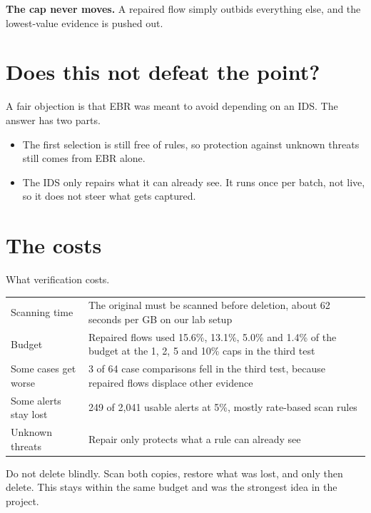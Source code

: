 \textbf{The cap never moves.} A repaired flow simply outbids everything else, and the lowest-value evidence is pushed out.

\section{Does this not defeat the point?}
A fair objection is that EBR was meant to avoid depending on an IDS. The answer has two parts.
\begin{itemize}
\item The first selection is still free of rules, so protection against unknown threats still comes from EBR alone.
\item The IDS only repairs what it can already see. It runs once per batch, not live, so it does not steer what gets captured.
\end{itemize}

\section{The costs}
\begin{gtable}{What verification costs.}
\begin{tabularx}{\linewidth}{l L}
\toprule
{} & \\
\midrule
Scanning time & The original must be scanned before deletion, about 62 seconds per GB on our lab setup\\
Budget & Repaired flows used 15.6\%, 13.1\%, 5.0\% and 1.4\% of the budget at the 1, 2, 5 and 10\% caps in the third test\\
Some cases get worse & 3 of 64 case comparisons fell in the third test, because repaired flows displace other evidence\\
Some alerts stay lost & 249 of 2,041 usable alerts at 5\%, mostly rate-based scan rules\\
Unknown threats & Repair only protects what a rule can already see\\
\bottomrule
\end{tabularx}
\end{gtable}

\begin{recap}
Do not delete blindly. Scan both copies, restore what was lost, and only then delete. This stays within the same budget and was the strongest idea in the project.
\end{recap}
